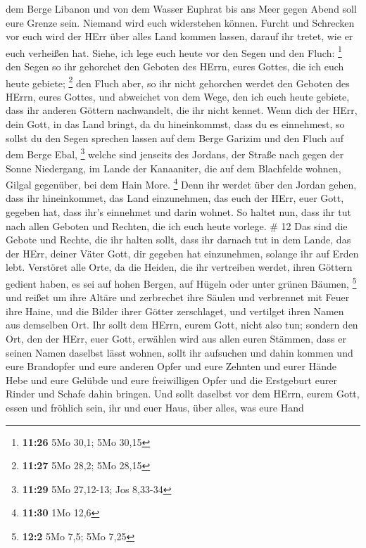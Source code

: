 dem Berge Libanon und von dem Wasser Euphrat bis ans Meer gegen Abend
soll eure Grenze sein.  Niemand wird euch widerstehen
können. Furcht und Schrecken vor euch wird der HErr über alles Land
kommen lassen, darauf ihr tretet, wie er euch verheißen hat.
 Siehe, ich lege euch heute vor den Segen und den Fluch:
\footnote{\textbf{11:26} 5Mo 30,1; 5Mo 30,15}  den Segen so
ihr gehorchet den Geboten des HErrn, eures Gottes, die ich euch heute
gebiete; \footnote{\textbf{11:27} 5Mo 28,2; 5Mo 28,15}  den
Fluch aber, so ihr nicht gehorchen werdet den Geboten des HErrn, eures
Gottes, und abweichet von dem Wege, den ich euch heute gebiete, dass ihr
anderen Göttern nachwandelt, die ihr nicht kennet.  Wenn
dich der HErr, dein Gott, in das Land bringt, da du hineinkommst, dass
du es einnehmest, so sollst du den Segen sprechen lassen auf dem Berge
Garizim und den Fluch auf dem Berge Ebal, \footnote{\textbf{11:29} 5Mo
  27,12-13; Jos 8,33-34}  welche sind jenseits des Jordans,
der Straße nach gegen der Sonne Niedergang, im Lande der Kanaaniter, die
auf dem Blachfelde wohnen, Gilgal gegenüber, bei dem Hain More.
\footnote{\textbf{11:30} 1Mo 12,6}  Denn ihr werdet über
den Jordan gehen, dass ihr hineinkommet, das Land einzunehmen, das euch
der HErr, euer Gott, gegeben hat, dass ihr's einnehmet und darin wohnet.
 So haltet nun, dass ihr tut nach allen Geboten und
Rechten, die ich euch heute vorlege. \# 12  Das sind die
Gebote und Rechte, die ihr halten sollt, dass ihr darnach tut in dem
Lande, das der HErr, deiner Väter Gott, dir gegeben hat einzunehmen,
solange ihr auf Erden lebt.  Verstöret alle Orte, da die
Heiden, die ihr vertreiben werdet, ihren Göttern gedient haben, es sei
auf hohen Bergen, auf Hügeln oder unter grünen Bäumen, \footnote{\textbf{12:2}
  5Mo 7,5; 5Mo 7,25}  und reißet um ihre Altäre und
zerbrechet ihre Säulen und verbrennet mit Feuer ihre Haine, und die
Bilder ihrer Götter zerschlaget, und vertilget ihren Namen aus demselben
Ort.  Ihr sollt dem HErrn, eurem Gott, nicht also tun;
 sondern den Ort, den der HErr, euer Gott, erwählen wird aus
allen euren Stämmen, dass er seinen Namen daselbst lässt wohnen, sollt
ihr aufsuchen und dahin kommen  und eure Brandopfer und eure
anderen Opfer und eure Zehnten und eurer Hände Hebe und eure Gelübde und
eure freiwilligen Opfer und die Erstgeburt eurer Rinder und Schafe dahin
bringen.  Und sollt daselbst vor dem HErrn, eurem Gott,
essen und fröhlich sein, ihr und euer Haus, über alles, was eure Hand
